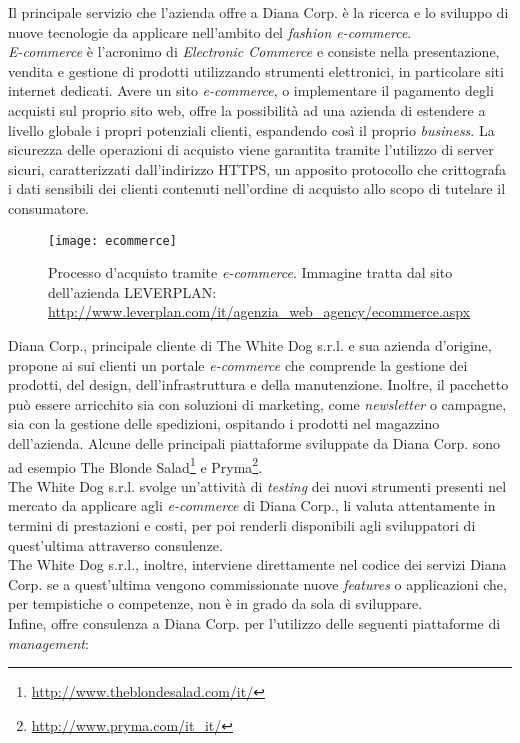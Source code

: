 Il principale servizio che l'azienda offre a Diana Corp. è la ricerca e lo sviluppo di nuove tecnologie da applicare nell'ambito del \textit{fashion e-commerce}. \\
\textit{E-commerce} è l'acronimo di \textit{Electronic Commerce} e consiste nella presentazione, vendita e gestione di prodotti utilizzando strumenti elettronici, in particolare siti internet dedicati. Avere un sito \textit{e-commerce}, o implementare il pagamento degli acquisti sul proprio sito web, offre la possibilità ad una azienda di estendere a livello globale i propri potenziali clienti, espandendo così il proprio \textit{business}. La sicurezza delle operazioni di acquisto viene garantita tramite l'utilizzo di server sicuri, caratterizzati dall'indirizzo HTTPS, un apposito protocollo che crittografa i dati sensibili dei clienti contenuti nell'ordine di acquisto allo scopo di tutelare il consumatore.

\label{E-commerce}
\begin{figure}[ht]
	\begin{center}
		\texttt{[image: ecommerce]}
		\caption{Processo d'acquisto tramite \textit{e-commerce}. Immagine tratta dal sito dell'azienda LEVERPLAN: \url{http://www.leverplan.com/it/agenzia_web_agency/ecommerce.aspx}}
	\end{center}
\end{figure}
\FloatBarrier

Diana Corp., principale cliente di The White Dog s.r.l. e sua azienda d'origine, propone ai sui clienti un portale \textit{e-commerce} che comprende la gestione dei prodotti, del design, dell'infrastruttura e della manutenzione. Inoltre, il pacchetto può essere arricchito sia con soluzioni di marketing, come \textit{newsletter} o campagne, sia con la gestione delle spedizioni, ospitando i prodotti nel magazzino dell'azienda. Alcune delle principali piattaforme sviluppate da Diana Corp. sono ad esempio The Blonde Salad\footnote[3]{\url{http://www.theblondesalad.com/it/}} e Pryma\footnote[4]{\url{http://www.pryma.com/it_it/}}. \\
The White Dog s.r.l. svolge un'attività di \textit{testing} dei nuovi strumenti presenti nel mercato da applicare agli \textit{e-commerce} di Diana Corp., li valuta attentamente in termini di prestazioni e costi, per poi renderli disponibili agli sviluppatori di quest'ultima attraverso consulenze. \\
The White Dog s.r.l., inoltre, interviene direttamente nel codice dei servizi Diana Corp. se a quest'ultima vengono commissionate nuove \textit{features} o applicazioni che, per tempistiche o competenze, non è in grado da sola di sviluppare. \\
Infine, offre consulenza a Diana Corp. per l'utilizzo delle seguenti piattaforme di \textit{management}:


